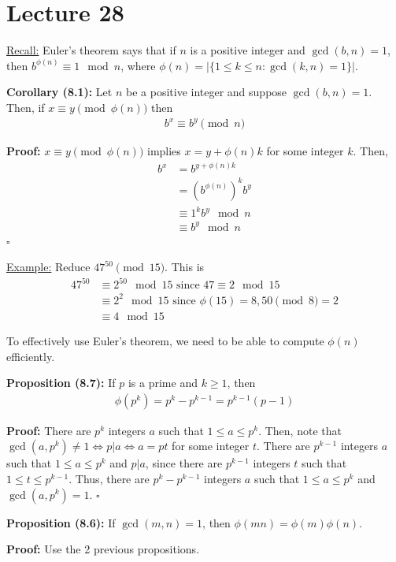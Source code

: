 \documentclass{article}
\newcommand*{\qed}{\hfill$\square$}%
\begin{document}
\section{Lecture 28}

\underline{Recall:} Euler's theorem says that if $n$ is a positive integer and $\gcd(b,n)=1$, then $b^{\phi(n)}\equiv 1\mod n$, where $\phi(n)=|\{1\leq k\leq n: \gcd(k,n)=1\}|$.

\textbf{Corollary (8.1):} Let $n$ be a positive integer and suppose $\gcd(b,n)=1$. Then, if $x\equiv y\pmod{\phi(n)}$ then \begin{align*}
    b^x\equiv b^y\pmod n
\end{align*}

\textbf{Proof:} $x\equiv y\pmod{\phi(n)}$ implies $x=y+\phi(n)k$ for some integer $k$. Then, \begin{align*}
    b^x&=b^{y+\phi(n)k}\\
    &=(b^{\phi(n)})^kb^y\\
    &\equiv 1^kb^y\mod n\\
    &\equiv b^y\mod n
\end{align*} \qed

\underline{Example:} Reduce $47^{50}\pmod{15}$. This is \begin{align*}
    47^{50}&\equiv 2^{50}\mod 15\text{ since } 47\equiv 2\mod 15\\
    &\equiv 2^{2}\mod 15\text{ since } \phi(15)=8, 50\pmod 8=2\\
    &\equiv 4\mod 15
\end{align*}

To effectively use Euler's theorem, we need to be able to compute $\phi(n)$ efficiently.

\textbf{Proposition (8.7):} If $p$ is a prime and $k\geq 1$, then \begin{align*}
    \phi(p^k)=p^k-p^{k-1}=p^{k-1}(p-1)
\end{align*}

\textbf{Proof:} There are $p^k$ integers $a$ such that $1\leq a\leq p^k$. Then, note that $\gcd(a,p^k)\neq 1\iff p|a\iff a=pt$ for some integer $t$. There are $p^{k-1}$ integers $a$ such that $1\leq a\leq p^k$ and $p|a$, since there are $p^{k-1}$ integers $t$ such that $1\leq t\leq p^{k-1}$. Thus, there are $p^k-p^{k-1}$ integers $a$ such that $1\leq a\leq p^k$ and $\gcd(a,p^k)=1$. \qed

\textbf{Proposition (8.6):} If $\gcd(m,n)=1$, then $\phi(mn)=\phi(m)\phi(n)$.

\textbf{Proof:} Use the 2 previous propositions.
\end{document}
